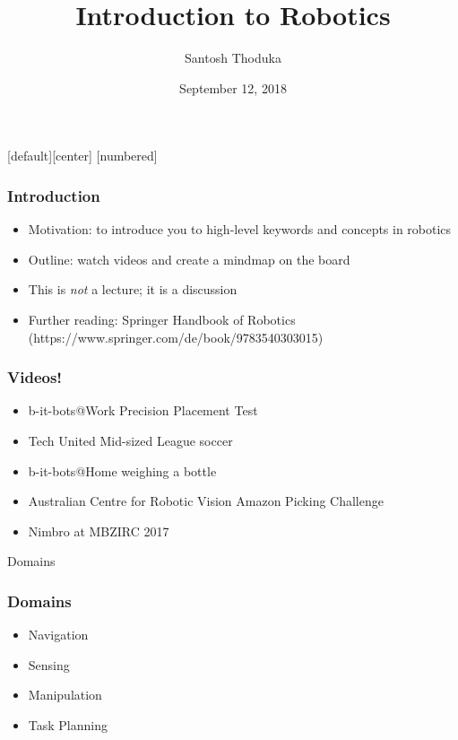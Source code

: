 \documentclass{beamer}
\title[]{Introduction to Robotics}
\author[Santosh Thoduka]{Santosh Thoduka}
\institute[HBRS]{Hochschule Bonn Rhein Sieg}
\date{September 12, 2018}
\begin{document}
[default][center]
[numbered]
\captionsetup[subfigure]{labelformat=empty}

\begin{frame}[plain]
\addtocounter{framenumber}{-1}
\maketitle
\end{frame}

\begin{frame}
\frametitle{Introduction}
\begin{itemize}
    \item Motivation: to introduce you to high-level keywords and concepts in robotics
    \item Outline: watch videos and create a mindmap on the board
    \item This is \emph{not} a lecture; it is a discussion
    \item Further reading: Springer Handbook of Robotics (https://www.springer.com/de/book/9783540303015)
\end{itemize}

\end{frame}

\begin{frame}
\frametitle{Videos!}
\begin{itemize}
\item <1-> b-it-bots@Work Precision Placement Test
\item <2-> Tech United Mid-sized League soccer
\item <3-> b-it-bots@Home weighing a bottle
\item <4-> Australian Centre for Robotic Vision Amazon Picking Challenge
\item <5-> Nimbro at MBZIRC 2017
\end{itemize}

\end{frame}

\begin{frame}[standout]
     Domains
\end{frame}

\begin{frame}
\frametitle{Domains}
\begin{itemize}
    \item Navigation
    \item Sensing
    \item Manipulation
    \item Task Planning
\end{itemize}
\end{frame}
\end{document}
